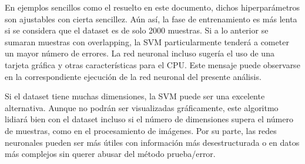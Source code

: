\documentclass[12pt,a4paper,table]{article}
\begin{document}
En ejemplos sencillos como el resuelto en este documento, dichos
hiperparámetros son ajustables con cierta sencillez. Aún así, la fase de
entrenamiento es más lenta si se considera que el dataset es de solo
2000 muestras. Si a lo anterior se sumaran muestras con overlapping, la
SVM particularmente tenderá a cometer un mayor número de errores. La red
neuronal incluso sugería el uso de una tarjeta gráfica y otras
características para el CPU. Este mensaje puede observarse en la
correspondiente ejecución de la red neuronal del presente análisis.

Si el dataset tiene muchas dimensiones, la SVM puede ser una excelente
alternativa. Aunque no podrán ser visualizadas gráficamente, este
algoritmo lidiará bien con el dataset incluso si el número de
dimensiones supera el número de muestras, como en el procesamiento de
imágenes. Por su parte, las redes neuronales pueden ser más útiles con
información más desestructurada o en datos más complejos sin querer
abusar del método prueba/error.


    
        
    
    
    
\end{document}
